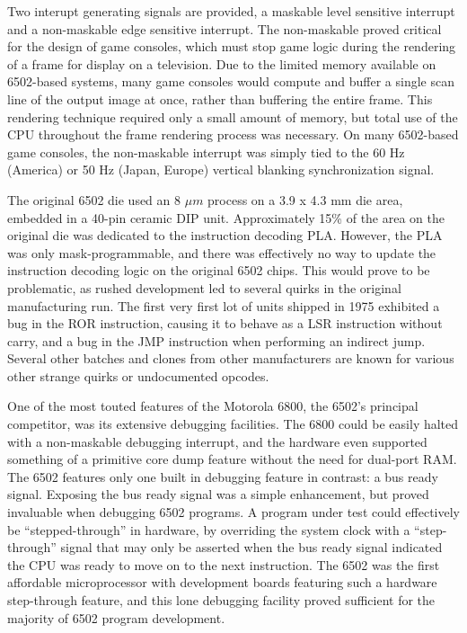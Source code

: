 \documentclass[journal]{IEEEtran}
\begin{document}
Two interupt generating signals are provided, a maskable level sensitive
interrupt and a non-maskable edge sensitive interrupt. The non-maskable proved
critical for the design of game consoles, which must stop game logic during the
rendering of a frame for display on a television. Due to the limited memory
available on 6502-based systems, many game consoles would compute and buffer a
single scan line of the output image at once, rather than buffering the entire
frame. This rendering technique required only a small amount of memory, but
total use of the CPU throughout the frame rendering process was necessary. On
many 6502-based game consoles, the non-maskable interrupt was simply tied to the
60 Hz (America) or 50 Hz (Japan, Europe) vertical blanking synchronization
signal.

The original 6502 die used an 8 $\mu m$ process on a 3.9 x 4.3 mm die area,
embedded in a 40-pin ceramic DIP unit. Approximately 15\% of the area on the
original die was dedicated to the instruction decoding PLA. However, the PLA was
only mask-programmable, and there was effectively no way to update the
instruction decoding logic on the original 6502 chips. This would prove to be
problematic, as rushed development led to several quirks in the original
manufacturing run. The first very first lot of units shipped in 1975 exhibited
a bug in the ROR instruction, causing it to behave as a LSR
instruction without carry, and a bug in the JMP instruction when
performing an indirect jump. Several other batches and clones from other
manufacturers are known for various other strange quirks or undocumented
opcodes.

One of the most touted features of the Motorola 6800, the 6502's principal
competitor, was its extensive debugging facilities. The 6800 could be easily
halted with a non-maskable debugging interrupt, and the hardware even supported
something of a primitive core dump feature without the need for dual-port RAM.
The 6502 features only one built in debugging feature in contrast: a bus ready
signal. Exposing the bus ready signal was a simple enhancement, but proved
invaluable when debugging 6502 programs. A program under test could effectively
be ``stepped-through'' in hardware, by overriding the system clock with a
``step-through'' signal that may only be asserted when the bus ready signal
indicated the CPU was ready to move on to the next instruction. The 6502 was the
first affordable microprocessor with development boards featuring such a
hardware step-through feature, and this lone debugging facility proved
sufficient for the majority of 6502 program development.
\end{document}
